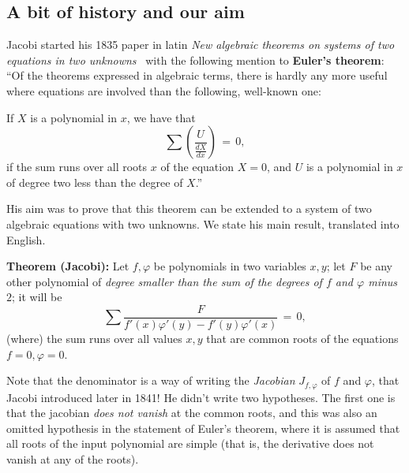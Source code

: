 \documentclass[a4paper,11pt]{amsart}
\numberwithin{thm}{section}
\numberwithin{equation}{section}
\theoremstyle{definition}
\theoremstyle{plain}
\begin{document}
\subsection{A bit of history and our aim}\label{ssec:history}

Jacobi started his 1835 paper in latin {\em New algebraic theorems on systems of two equations in two unknowns}~\cite{Jacobi}  
with the following mention to {\bf Euler's theorem}: ``Of the theorems expressed in algebraic terms, there is hardly any more useful where equations are involved than the following, well-known one:  

\smallskip

If $X$ is a polynomial in $x$, we have that
\begin{equation} \label{eq:Euler} \sum \left( \frac U {\frac {dX} {dx}}\right) \, = \, 0,\end{equation}
if the sum runs over all roots $x$ of the equation $X=0$, and $U$ is a polynomial in $x$ of degree two less than the degree of $X$.''

\smallskip

His aim was to prove that this theorem can be extended to a system of two algebraic equations with two unknowns. We state his main result, translated into English.

\smallskip

{\bf Theorem (Jacobi):}
 Let  $f, \varphi$ be polynomials in two variables $x,y$; let $F$ be any other polynomial of {\em degree smaller than
the sum of the degrees of $f$ and $\varphi$ minus $2$}; it will be
\begin{equation}\label{eq:Jacobi}
\sum \frac F {f'(x) {\varphi}'(y) - f'(y) {\varphi}'(x) }\, = \, 0,\end{equation}
(where) the sum runs over all values $x,y$ that are common roots  of the equations $f=0, \varphi=0$.

\smallskip

Note that the denominator is a way of writing the {\em Jacobian}  $J_{f, \varphi}$ of $f$ and $\varphi$, that Jacobi introduced
later in 1841! He didn't write two hypotheses. The first one is that the jacobian  {\em does not vanish}  
at the common roots, and this was also an omitted hypothesis in the statement of
Euler's theorem, where it is assumed that all roots of the input polynomial are simple (that is, the derivative does not vanish at any of the roots). 
\end{document}
